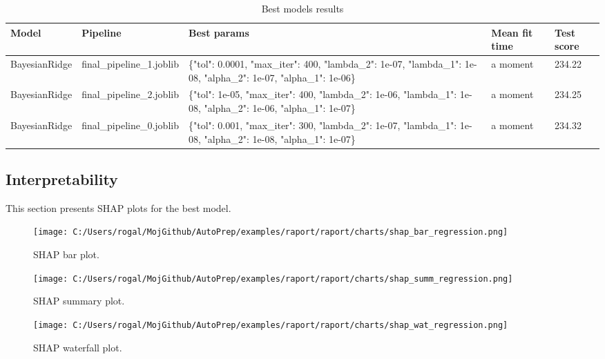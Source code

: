 \documentclass{article}%
\begin{document}
\begin{table}[H]%
\begin{center}%
\renewcommand{\arraystretch}{1.5}%
\begin{tabular}{p{35mm} p{35mm} p{45mm} p{25mm} p{15mm}}%
\hline%
\textbf{Model}&\textbf{Pipeline}&\textbf{Best params}&\textbf{Mean fit time}&\textbf{Test score}\\%
\hline%
BayesianRidge&final\_pipeline\_1.joblib&\{"tol": 0.0001, "max\_iter": 400, "lambda\_2": 1e{-}07, "lambda\_1": 1e{-}08, "alpha\_2": 1e{-}07, "alpha\_1": 1e{-}06\}&a moment&234.22\\%
BayesianRidge&final\_pipeline\_2.joblib&\{"tol": 1e{-}05, "max\_iter": 400, "lambda\_2": 1e{-}06, "lambda\_1": 1e{-}08, "alpha\_2": 1e{-}06, "alpha\_1": 1e{-}07\}&a moment&234.25\\%
BayesianRidge&final\_pipeline\_0.joblib&\{"tol": 0.001, "max\_iter": 300, "lambda\_2": 1e{-}07, "lambda\_1": 1e{-}08, "alpha\_2": 1e{-}08, "alpha\_1": 1e{-}07\}&a moment&234.32\\%
\hline%
\end{tabular}%
\end{center}%
\caption{Best models results}%
\label{tab:best_models_results}%
\end{table}

%
\subsection{Interpretability}%
\label{subsec:Interpretability}%

%
This section presents SHAP plots for the best model.%


\begin{figure}[H]%
\centering%
\texttt{[image: C:/Users/rogal/MojGithub/AutoPrep/examples/raport/raport/charts/shap\_bar\_regression.png]}%
\caption{SHAP bar plot.}%
\end{figure}

%


\begin{figure}[H]%
\centering%
\texttt{[image: C:/Users/rogal/MojGithub/AutoPrep/examples/raport/raport/charts/shap\_summ\_regression.png]}%
\caption{SHAP summary plot.}%
\end{figure}

%


\begin{figure}[H]%
\centering%
\texttt{[image: C:/Users/rogal/MojGithub/AutoPrep/examples/raport/raport/charts/shap\_wat\_regression.png]}%
\caption{SHAP waterfall plot.}%
\end{figure}

%
\end{document}
